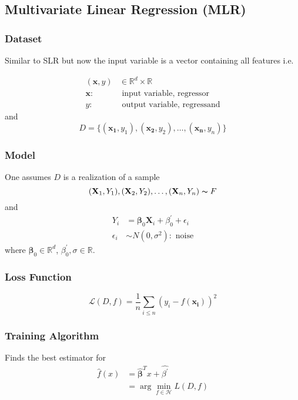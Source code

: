 \subsection{Multivariate Linear Regression (MLR)}
\subsubsection{Dataset}
Similar to SLR but now the input variable is a vector containing all features i.e.

\begin{align*}
    (\mathbf{x},y) & \in\mathbb{R}^d\times\mathbb{R}     \\
    \mathbf{x}:    & \text{ input variable, regressor}   \\
    y:             & \text{ output variable, regressand}
\end{align*}
and
\begin{equation*}
    D=\{(\mathbf{x_1},y_1),(\mathbf{x_2},y_2),\dots,(\mathbf{x_n},y_n)\}
\end{equation*}

\subsubsection{Model}
One assumes $D$ is a realization of a sample
\begin{equation*}
    (\mathbf{X}_1,Y_1),(\mathbf{X}_2,Y_2),\dots,(\mathbf{X}_n,Y_n)\thicksim F
\end{equation*}
and
\begin{align*}
    Y_i        & =\boldsymbol{\beta}_0\mathbf{X}_i+\beta^{\prime}_0+\epsilon_i \\
    \epsilon_i & \sim N(0,\sigma^2): \text{ noise}
\end{align*}
where $\boldsymbol{\beta}_0\in \mathbb{R}^d$, $\beta^{\prime}_0,\sigma \in \mathbb{R}$.

\subsubsection{Loss Function}
\begin{equation*}
    \mathcal{L}(D,f)=\frac{1}{n}\sum_{i\leq n}{\left(y_i-f(\mathbf{x_i})\right)}^2
\end{equation*}


\subsubsection{Training Algorithm}
Finds the best estimator for
\begin{align*}
    \hat{f}(x) & =\hat{\boldsymbol{\beta}}^T x+\widehat{\beta^{\prime}} \\
               & =\arg\min_{f\in\mathcal{H}}L(D,f)
\end{align*}

